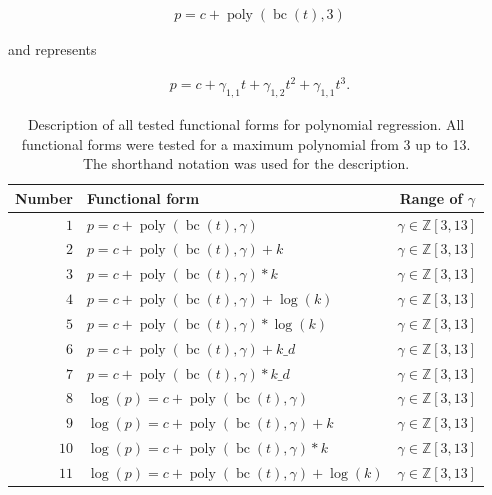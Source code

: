 \documentclass[12pt,a4paper]{article}
\DeclareMathOperator{\bc}{bc}
\DeclareMathOperator{\poly}{poly}
\begin{document}
\begin{align}
    p = c + \poly\left( \bc(t), 3 \right)
\end{align}

and represents

\begin{align}
    p = c + \gamma_{1,1} t + \gamma_{1,2} t^2 + \gamma_{1,1} t^3 .
\end{align}

\begin{table}
    \centering
    \caption{Description of all tested functional forms for polynomial regression. All functional forms were tested for a maximum polynomial from 3 up to 13. The shorthand notation was used for the description.}
    \label{tab:func_form}    
    \begin{tabular}{rlc}
        Number & Functional form & Range of $\gamma$ \\
        \toprule
        $1$ & $p = c + \poly\left( \bc(t), \gamma \right) $ & $\gamma \in \mathbb{Z} \left[3, 13 \right]$\\ 
        $2$ & $p = c + \poly\left( \bc(t), \gamma \right) + k $ & $\gamma \in \mathbb{Z} \left[3, 13 \right]$\\
        $3$ & $p = c + \poly\left( \bc(t), \gamma \right) * k $ & $\gamma \in \mathbb{Z} \left[3, 13 \right]$\\
        $4$ & $p = c + \poly\left( \bc(t), \gamma \right) + \log(k) $ & $\gamma \in \mathbb{Z} \left[3, 13 \right]$\\
        $5$ & $p = c + \poly\left( \bc(t), \gamma \right) * \log(k) $ & $\gamma \in \mathbb{Z} \left[3, 13 \right]$\\
        $6$ & $p = c + \poly\left( \bc(t), \gamma \right) + k\_d $ & $\gamma \in \mathbb{Z} \left[3, 13 \right]$\\
        $7$ & $p = c + \poly\left( \bc(t), \gamma \right) * k\_d $ & $\gamma \in \mathbb{Z} \left[3, 13 \right]$\\ %
        \midrule
        $8$ & $\log(p) = c + \poly\left( \bc(t), \gamma \right) $ & $\gamma \in \mathbb{Z} \left[3, 13 \right]$\\ 
        $9$ & $\log(p) = c + \poly\left( \bc(t), \gamma \right) + k $ & $\gamma \in \mathbb{Z} \left[3, 13 \right]$\\
        $10$ & $\log(p) = c + \poly\left( \bc(t), \gamma \right) * k $ & $\gamma \in \mathbb{Z} \left[3, 13 \right]$\\
        $11$ & $\log(p) = c + \poly\left( \bc(t), \gamma \right) + \log(k) $ & $\gamma \in \mathbb{Z} \left[3, 13 \right]$\\

\end{tabular}
\end{table}
\end{document}
